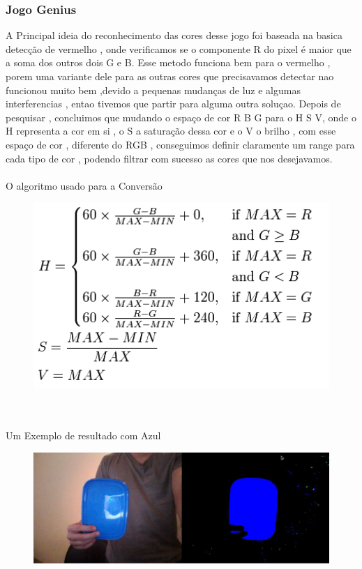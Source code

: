 \documentclass{sciposter}
\begin{document}
\begin{multicols}{3}
\subsubsection*{Jogo Genius}

A Principal ideia do reconhecimento das cores desse jogo foi baseada na basica detecção de vermelho , onde verificamos se o componente R do pixel é maior que a soma dos outros dois G e B.
Esse metodo funciona bem para o vermelho , porem uma variante dele para as outras cores que precisavamos detectar nao funcionou muito bem ,devido a pequenas mudanças de luz  e algumas interferencias , entao tivemos que partir para alguma outra soluçao.
Depois de pesquisar  , concluimos que mudando o espaço de cor R B G para o H S V, onde o H representa a cor em si , o S a saturação dessa cor e o V o brilho , com esse espaço de cor , diferente do RGB , conseguimos definir claramente um range para cada tipo de cor , podendo filtrar com sucesso as cores que nos desejavamos.
\\
\\
O algoritmo usado para a Conversão

\begin{figure}[ht]
\centering
\includegraphics[width=8in]{img4.png}
\end{figure}

\\
\\


Um Exemplo de resultado com Azul

\begin{figure}[ht]
\centering
\includegraphics[width=8in]{img2.jpg}
\end{figure}



\end{multicols}
\end{document}
